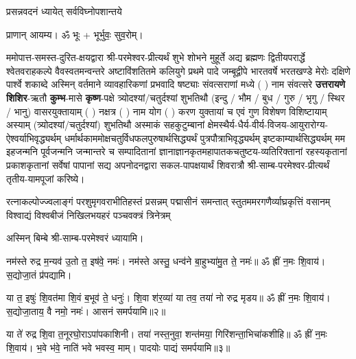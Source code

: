 

{प्रसन्नवदनं ध्यायेत् सर्वविघ्नोपशान्तये}
 
प्राणान्  आयम्य।  ॐ भूः + भूर्भुवः॒ सुव॒रोम्।

ममोपात्त-समस्त-दुरित-क्षयद्वारा श्री-परमेश्वर-प्रीत्यर्थं शुभे शोभने मुहूर्ते अद्य ब्रह्मणः
द्वितीयपरार्द्धे श्वेतवराहकल्पे वैवस्वतमन्वन्तरे अष्टाविंशतितमे कलियुगे प्रथमे पादे
जम्बूद्वीपे भारतवर्षे भरतखण्डे मेरोः दक्षिणे पार्श्वे शकाब्दे अस्मिन् वर्तमाने व्यावहारिकणां
 प्रभवादि षष्ट्याः संवत्सराणां मध्ये (  ) नाम संवत्सरे \textbf{उत्तरायणे} 
\textbf{शिशिर}-ऋतौ  \textbf{कुम्भ}-मासे \textbf{कृष्ण}-पक्षे त्र्योदश्यां/चतुर्दश्यां शुभतिथौ
(इन्दु / भौम / बुध / गुरु / भृगु / स्थिर / भानु) वासरयुक्तायाम्
(  ) नक्षत्र (  ) नाम  योग  (  ) करण युक्तायां च एवं गुण विशेषण विशिष्टायाम्
अस्याम् (त्र्योदश्यां/चतुर्दश्यां) शुभतिथौ 
अस्माकं सहकुटुम्बानां क्षेमस्थैर्य-धैर्य-वीर्य-विजय-आयुरारोग्य-ऐश्वर्याभिवृद्ध्यर्थम्
 धर्मार्थकाममोक्ष\-चतुर्विधफलपुरुषार्थसिद्ध्यर्थं पुत्रपौत्राभि\-वृद्ध्यर्थम् इष्टकाम्यार्थसिद्ध्यर्थम्
मम इहजन्मनि पूर्वजन्मनि जन्मान्तरे च सम्पादितानां ज्ञानाज्ञानकृतमहा\-पातकचतुष्टय-व्यतिरिक्तानां रहस्यकृतानां प्रकाशकृतानां सर्वेषां पापानां सद्य अपनोदनद्वारा सकल-पापक्षयार्थं शिवरात्रौ श्री-साम्ब-परमेश्वर-प्रीत्यर्थं तृतीय-यामपूजां करिष्ये।


{रत्नाकल्पोज्ज्वलाङ्गं परशुमृगवराभीतिहस्तं प्रसन्नम्}
{पद्मासीनं समन्तात् स्तुतममरगणैर्व्याघ्रकृत्तिं वसानम्}
{विश्वाद्यं विश्वबीजं निखिलभयहरं पञ्चवक्त्रं त्रिनेत्रम्}

अस्मिन् बिम्बे श्री-साम्ब-परमेश्वरं ध्यायामि। 

नम॑स्ते रुद्र म॒न्यव॑ उ॒तो त॒ इष॑वे॒ नमः॑। नम॑स्ते अस्तु॒ धन्व॑ने बा॒हुभ्या॑मु॒त ते॒ नमः॑॥ ॐ ह्रीं न॒मः शि॒वाय॑। स॒द्योजा॒तं प्र॑पद्यामि।

या त॒ इषुः॑ शि॒वत॑मा शि॒वं ब॒भूव॑ ते॒ धनुः॑। शि॒वा श॑र॒व्या॑ या तव॒ तया॑ नो रुद्र मृडय॥ ॐ ह्रीं न॒मः शि॒वाय॑। स॒द्योजा॒ताय॒ वै नमो॒ नमः॑। आसनं समर्पयामि॥२॥

या ते॑ रुद्र शि॒वा त॒नूरघो॒राऽपा॑पकाशिनी। तया॑ नस्त॒नुवा॒ शन्त॑मया॒ गिरि॑शन्ता॒\-भिचा॑कशीहि॥ ॐ ह्रीं न॒मः शि॒वाय॑। भ॒वे भ॑वे॒ नाति॑ भवे भवस्व॒ माम्। पादयोः पाद्यं समर्पयामि॥३॥

